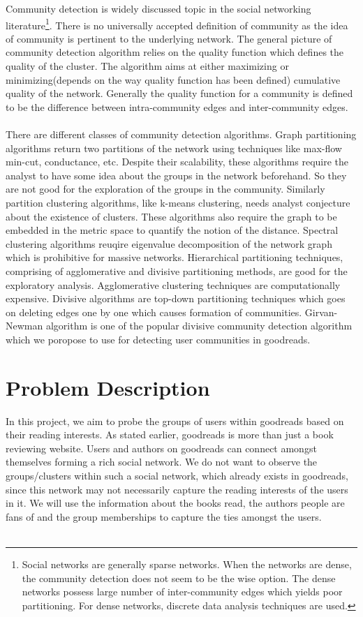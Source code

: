 \documentclass[12pt]{article}
\begin{document}
Community detection is widely discussed topic in the social networking literature\footnote{Social networks are generally sparse networks. When the networks are dense, the community detection does not seem to be the wise option. The dense networks possess large number of inter-community edges which yields poor partitioning. For dense networks, discrete data analysis techniques are used.}. There is no universally accepted definition of community as the idea of community is pertinent to the underlying network. The general picture of community detection algorithm relies on the quality function which defines the quality of the cluster. The algorithm aims at either maximizing or minimizing(depends on the way quality function has been defined) cumulative quality of the network. Generally the quality function for a community is defined to be the difference between intra-community edges and inter-community edges. \\\\

There are different classes of community detection algorithms. Graph partitioning algorithms return two partitions of the network using techniques like max-flow min-cut, conductance, etc. Despite their scalability, these algorithms require the analyst to have some idea about the groups in the network beforehand. So they are not good for the exploration of the groups in the community. Similarly partition clustering algorithms, like k-means clustering, needs analyst conjecture about the existence of clusters. These algorithms also require the graph to be embedded in the metric space to quantify the notion of the distance. Spectral clustering algorithms reuqire eigenvalue decomposition of the network graph which is prohibitive for massive networks. Hierarchical partitioning techniques, comprising of agglomerative and divisive partitioning methods, are good for the exploratory analysis. Agglomerative clustering techniques are computationally expensive. Divisive algorithms are top-down partitioning techniques which goes on deleting edges one by one which causes formation of communities. Girvan-Newman algorithm is one of the popular divisive community detection algorithm which we poropose to use for detecting user communities in goodreads.


\section{Problem Description}

In this project, we aim to probe the groups of users within goodreads based on their reading interests. As stated earlier, goodreads is more than just a book reviewing website. Users and authors on goodreads can connect amongst themselves forming a rich social network. We do not want to observe the groups/clusters within such a social network, which already exists in goodreads, since this network may not necessarily capture the reading interests of the users in it. We will use the information about the books read, the authors people are fans of and the group memberships to capture the ties amongst the users. \\\\
\end{document}
